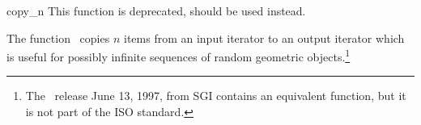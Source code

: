 \begin{ccRefFunction}{copy_n}
  This function is deprecated,  should be used instead.
  \begin{ccDeprecated}
    \label{sectionCopyN}

    \ccDefinition The function \ccRefName\ copies $n$ items from an
    input iterator to an output iterator which is useful for possibly
    infinite
    sequences of random geometric objects.\footnote{%
      The \stl\ release June 13, 1997, from SGI contains an equivalent
      function, but it is not part of the ISO standard.}
  
  
  
    \ccSeeAlso
  \end{ccDeprecated}
\end{ccRefFunction}

